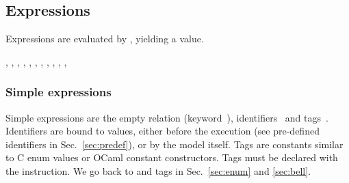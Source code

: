 \subsection{\label{language:expression}Expressions}
Expressions are evaluated by \herd, yielding a value.
\begin{syntax}
 \is{} 
\alt {}
\alt {}
\alt \T{(}\T{)} \orelse \T{(}  \T{,}  \brepet{} \T{,}  \erepet \T{)}
\alt \T{\{}\T{\}} \orelse \T{\{}  \brepet{} \T{,}  \erepet \T{\}}
\alt {}\T{*} \orelse {}\T{+} \orelse {}
\orelse {}
\alt \T{\textasciitilde}
\alt \T{[}\T{]}
\alt {}\T{|} \orelse
{}\T{++} \orelse
{}\T{;} \orelse
{}\T{\textbackslash} \orelse
{}\T{\&} \orelse
{} \T{*} 
\alt {} 
\alt {}  \T{->} 
\alt {} \boption{}  \eoption {} \brepet{}   \erepet{}  
\alt {}    
\alt \T{(}\T{)} \orelse  {}  
\alt {} \NT{[taglist]}
\sep
\sep
{} \is {} 
\sep
{} \is {}
\sep
{} \is {} \orelse \T{(}\T{)} \orelse \T{(}  \brepet{} \T{,}  \erepet \T{)}
\sep
{} \is {} \orelse {}
\sep
{} \is {} \T{=} 
\sep
{} \is {}  \T{=} 
\sep
\sep
{} \is {} \orelse {}
\sep
{} \is \boption{} \T{||} \eoption {} \T{->} 
\brepet{} \T{||}  \T{->}  \erepet
\boption \T{\_} \T{->}  \eoption
\sep
{} \is \boption{} \T{||} \eoption \T{\{}\T{\}} \T{->} 
\T{||}  \T{++}  \T{->} 
\end{syntax}

\subsubsection*{Simple expressions}
Simple expressions are the empty relation (keyword~),
identifiers~ and tags~.  Identifiers are bound to
values, either before the execution (see pre-defined identifiers in
Sec.~\ref{sec:predef}), or by the model itself.  Tags are constants similar to
C enum values or OCaml constant constructors.  Tags must be declared with the
 instruction. We go back to  and tags in Sec.~\ref{sec:enum}
and \ref{sec:bell}.

